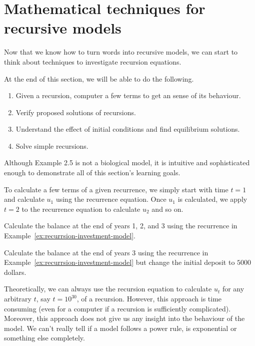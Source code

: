 \documentclass[../main.tex]{subfiles}
\begin{document}
 \section{Mathematical techniques for recursive models}

Now that we know how to turn words into recursive models, we can start to think about techniques to investigate recursion equations. 

At the end of this section, we will be able to do the following.
\begin{enumerate}
  \item Given a recursion, computer a few terms to get an sense of its behaviour.
  \item Verify proposed solutions of recursions.
  \item Understand the effect of initial conditions and find equilibrium solutions.
  \item Solve simple recursions.
\end{enumerate}

\faLightbulb{} Although Example 2.5 is not a biological model, it is intuitive and sophisticated enough to demonstrate all of this section's learning goals.

To calculate a few terms of a given recurrence, we simply start with time \(t=1\) and calculate \(u_{1}\) using the recurrence equation. Once \(u_{1}\) is calculated, we apply \(t = 2\) to the recurrence equation to calculate \(u_{2}\) and so on.
\begin{example} \label{ex:recurrence-bruteforce}
  Calculate the balance at the end of years 1, 2, and 3 using the recurrence in Example~\ref{ex:recurrsion-investment-model}.
\end{example}

\begin{example}
  Calculate the balance at the end of years 3 using the recurrence in Example~\ref{ex:recurrsion-investment-model} but change the initial deposit to \(5000\) dollars.
\end{example}

\clearpage

Theoretically, we can always use the recursion equation to calculate \(u_{t}\) for any arbitrary \(t\), say \(t = 10^{30}\), of a recursion. However, this approach is time consuming (even for a computer if a recursion is sufficiently complicated). Moreover, this approach does not give us any insight into the behaviour of the model. We can't really tell if a model follows a power rule, is exponential or something else completely. 
\end{document}
